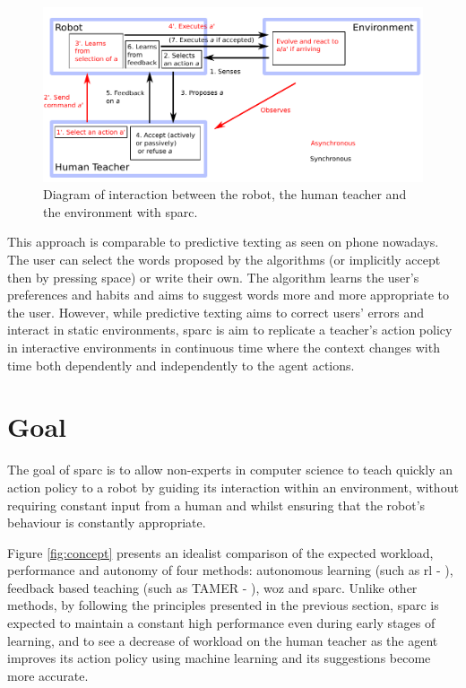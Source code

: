 \begin{figure}[ht]
	\includegraphics[width=.8\linewidth]{diagram.pdf}
	\centering
	\caption{Diagram of interaction between the robot, the human teacher and the environment with \gls{sparc}.}
	\label{fig:sparc_diagram}
\end{figure}

This approach is comparable to predictive texting as seen on phone nowadays. The user can select the words proposed by the algorithms (or implicitly accept then by pressing space) or write their own. The algorithm learns the user's preferences and habits and aims to suggest words more and more appropriate to the user. However, while predictive texting aims to correct users' errors and interact in static environments, \gls{sparc} is aim to replicate a teacher's action policy in interactive environments in continuous time where the context changes with time both dependently and independently to the agent actions.


\section{Goal}

The goal of \gls{sparc} is to allow non-experts in computer science to teach quickly an action policy to a robot by guiding its interaction within an environment, without requiring constant input from a human and whilst ensuring that the robot's behaviour is constantly appropriate. 

Figure \ref{fig:concept} presents an idealist comparison of the expected workload, performance and autonomy of four methods: autonomous learning (such as \gls{rl} - \citealt{sutton1998reinforcement}), feedback based teaching (such as TAMER - \citealt{knox2009interactively}), \gls{woz} and \gls{sparc}. Unlike other methods, by following the principles presented in the previous section, \gls{sparc} is expected to maintain a constant high performance even during early stages of learning, and to see a decrease of workload on the human teacher as the agent improves its action policy using machine learning and its suggestions become more accurate.

